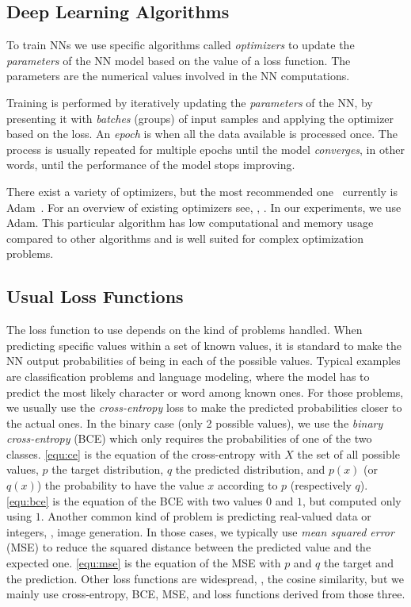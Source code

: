 \subsection{Deep Learning Algorithms}
To train NNs we use specific algorithms called \textit{optimizers} to update the \textit{parameters} of the NN model based on the value of a loss function.
The parameters are the numerical values involved in the NN computations.%

Training is performed by iteratively updating the \textit{parameters} of the NN, by presenting it with \textit{batches} (groups) of input samples and applying the optimizer based on the loss.
An \textit{epoch} is when all the data available is processed once.
The process is usually repeated for multiple epochs until the model \textit{converges}, in other words, until the performance of the model stops improving.

There exist a variety of optimizers, but the most recommended one~\cite{optim:2016:ruder} currently is Adam~\cite{adam:2015:kingma}.
For an overview of existing optimizers see, \eg, \cite{optim:2016:ruder}.
In our experiments, we use Adam.
This particular algorithm has low computational and memory usage compared to other algorithms and is well suited for complex optimization problems.

\subsection{Usual Loss Functions}
The loss function to use depends on the kind of problems handled.
%
When predicting specific values within a set of known values, it is standard to make the NN output probabilities of being in each of the possible values.
Typical examples are classification problems and language modeling, where the model has to predict the most likely character or word among known ones.
For those problems, we usually use the \textit{cross-entropy} loss to make the predicted probabilities closer to the actual ones.
In the binary case (only 2 possible values), we use the \textit{binary cross-entropy} (BCE) which only requires the probabilities of one of the two classes. \cref{equ:ce} is the equation of the cross-entropy with $X$ the set of all possible values, $p$ the target distribution, $q$ the predicted distribution, and $p(x)$ (or $q(x)$) the probability to have the value $x$ according to $p$ (respectively $q$). \cref{equ:bce} is the equation of the BCE with two values $0$ and $1$, but computed only using $1$.
%
Another common kind of problem is predicting real-valued data or integers, \eg, image generation.
In those cases, we typically use \textit{mean squared error} (MSE) to reduce the squared distance between the predicted value and the expected one.
\cref{equ:mse} is the equation of the MSE with $p$ and $q$ the target and the prediction.
%
Other loss functions are widespread, \eg, the cosine similarity, but we mainly use cross-entropy, BCE, MSE, and loss functions derived from those three.

